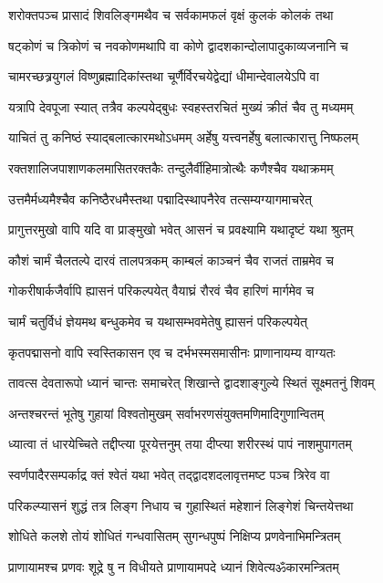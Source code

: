 \twolineshloka
{शरोक्तपञ्च प्रासादं शिवलिङ्गमथैव च}
{सर्वकामफलं वृक्षं कुलकं कोलकं तथा}%

\twolineshloka
{षट्कोणं च त्रिकोणं च नवकोणमथापि वा}
{कोणे द्वादशकान्दोलापादुकाव्यजनानि च}%

\twolineshloka
{चामरच्छत्र्रयुगलं विष्णुब्रह्मादिकांस्तथा}
{चूर्णैर्विरचयेद्वेद्यां धीमान्देवालयेऽपि वा}%

\twolineshloka
{यत्रापि देवपूजा स्यात् तत्रैव कल्पयेद्बुधः}
{स्वहस्तरचितं मुख्यं क्रीतं चैव तु मध्यमम्}%

\twolineshloka
{याचितं तु कनिष्ठं स्याद्बलात्कारमथोऽधमम्}
{अर्हेषु यत्त्वनर्हेषु बलात्कारात्तु निष्फलम्}%

\twolineshloka
{रक्तशालिजपाशाणकलमासितरक्तकैः}
{तन्दुलैर्वीहिमात्रोत्थैः कणैश्चैव यथाक्रमम्}%

\twolineshloka
{उत्तमैर्मध्यमैश्चैव कनिष्ठैरधमैस्तथा}
{पद्मादिस्थापनैरेव तत्सम्यग्यागमाचरेत्}%

\twolineshloka
{प्रागुत्तरमुखो वापि यदि वा प्राङ्मुखो भवेत्}
{आसनं च प्रवक्ष्यामि यथादृष्टं यथा श्रुतम्}%

\twolineshloka
{कौशं चार्मं चैलतल्पे दारवं तालपत्रकम्}
{काम्बलं काञ्चनं चैव राजतं ताम्रमेव च}%

\twolineshloka
{गोकरीषार्कजैर्वापि ह्यासनं परिकल्पयेत्}
{वैयाघ्रं रौरवं चैव हारिणं मार्गमेव च}%

\twolineshloka
{चार्मं चतुर्विधं ज्ञेयमथ बन्धुकमेव च}
{यथासम्भवमेतेषु ह्यासनं परिकल्पयेत्}%

\twolineshloka
{कृतपद्मासनो वापि स्वस्तिकासन एव च}
{दर्भभस्मसमासीनः प्राणानायम्य वाग्यतः}%

\twolineshloka
{तावत्स देवतारूपो ध्यानं चान्तः समाचरेत्}
{शिखान्ते द्वादशाङ्गुल्ये स्थितं सूक्ष्मतनुं शिवम्}%

\twolineshloka
{अन्तश्चरन्तं भूतेषु गुहायां विश्वतोमुखम्}
{सर्वाभरणसंयुक्तमणिमादिगुणान्वितम्}%

\twolineshloka
{ध्यात्वा तं धारयेच्चिते तद्दीप्त्या पूरयेत्तनुम्}
{तया दीप्त्या शरीरस्थं पापं नाशमुपागतम्}%

\twolineshloka
{स्वर्णपादैरसम्पर्काद्र क्तं श्वेतं यथा भवेत्}
{तद्द्वादशदलावृत्तमष्ट पञ्च त्रिरेव वा}%

\twolineshloka
{परिकल्प्यासनं शुद्धं तत्र लिङ्ग निधाय च}
{गुहास्थितं महेशानं लिङ्गेशं चिन्तयेत्तथा}%

\twolineshloka
{शोधिते कलशे तोयं शोधितं गन्धवासितम्}
{सुगन्धपुष्पं निक्षिप्य प्रणवेनाभिमन्त्रितम्}%

\twolineshloka
{प्राणायामश्च प्रणवः शूद्रे षु न विधीयते}
{प्राणायामपदे ध्यानं शिवेत्यॐकारमन्त्रितम्}%

